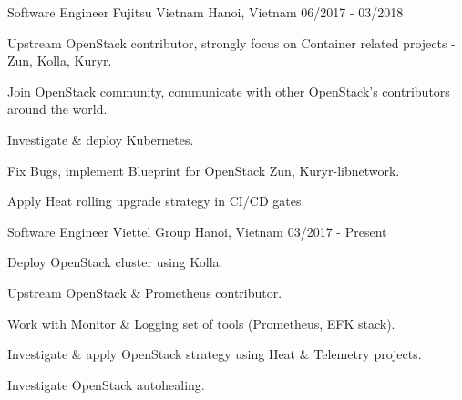 \begin{cventries}
  \cventry
    {Software Engineer} %
    {Fujitsu Vietnam} %
    {Hanoi, Vietnam} %
    {06/2017 - 03/2018} %
    {
      \begin{cvitems} %
      	\item {Upstream OpenStack contributor, strongly focus on Container related projects - Zun, Kolla, Kuryr.}
      	\item {Join OpenStack community, communicate with other OpenStack's contributors around the world.}
        \item {Investigate \& deploy Kubernetes.}
        \item {Fix Bugs, implement Blueprint for OpenStack Zun, Kuryr-libnetwork.}
        \item {Apply Heat rolling upgrade strategy in CI/CD gates.}
      \end{cvitems}
    }
  \cventry
    {Software Engineer} %
    {Viettel Group} %
    {Hanoi, Vietnam} %
    {03/2017 - Present} %
    {
      \begin{cvitems} %
        \item {Deploy OpenStack cluster using Kolla.}
        \item {Upstream OpenStack \& Prometheus contributor.}
        \item {Work with Monitor \& Logging set of tools (Prometheus, EFK stack).}
        \item {Investigate \& apply OpenStack strategy using Heat \& Telemetry projects.}
        \item {Investigate OpenStack autohealing.}
      \end{cvitems}
    }


\end{cventries}
